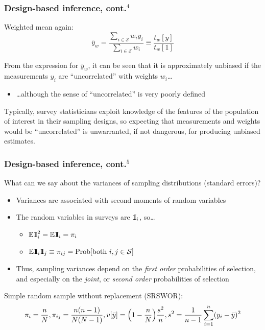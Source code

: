 \documentclass{beamer}
\newcommand{\Expect}{\mathbb{E}}
\newcommand{\One}{{\rm 1\kern-0.3em I}}
\begin{document}
\begin{frame}\frametitle{Design-based inference, cont.$^4$}

Weighted mean again:
$$ \bar y_w = \frac{\sum_{i\in\mathcal{S}} w_i y_i}{\sum_{i\in\mathcal{S}} w_i} \equiv \frac{t_w[y]}{t_w[1]} $$

\bigskip

From the expression for $\bar y_w$, it can be seen that it is approximately unbiased
if the measurements $y_i$ are ``uncorrelated'' with weights $w_i$\ldots
\begin{itemize}
    \item \ldots although the sense of ``uncorrelated'' is very poorly defined
\end{itemize}
Typically, survey statisticians exploit knowledge of the features of the population of interest
in their sampling designs, so expecting that measurements and weights would be ``uncorrelated'' is
unwarranted, if not dangerous, for producing unbiased estimates.

\end{frame}

\begin{frame}\frametitle{Design-based inference, cont.$^5$}

What can we say about the variances of sampling distributions (standard errors)?

\begin{itemize}
    \item Variances are associated with second moments of random variables
    \item The random variables in surveys are $\One_i$, so\ldots
        \begin{itemize}
            \item $\Expect \One_i^2 = \Expect \One_i = \pi_i$
            \item $\Expect \One_i \One_j \equiv \pi_{ij} = {\rm Prob}[\mbox{both }i,j \in \mathcal{S}]$
        \end{itemize}
    \item Thus, sampling variances depend on the \textit{first order}
        probabilities of selection, and especially on the
        \textit{joint}, or \textit{second order} probabilities of selection
\end{itemize}

Simple random sample without replacement (SRSWOR):
$$
\pi_i = \frac{n}{N}, \pi_{ij} = \frac{n(n-1)}{N(N-1)}, v[\bar y] = \Bigl(1-\frac nN\Bigr)\frac{s^2}n,
s^2 = \frac1{n-1} \sum_{i=1}^n (y_i - \bar y)^2
$$


\end{frame}
\end{document}
